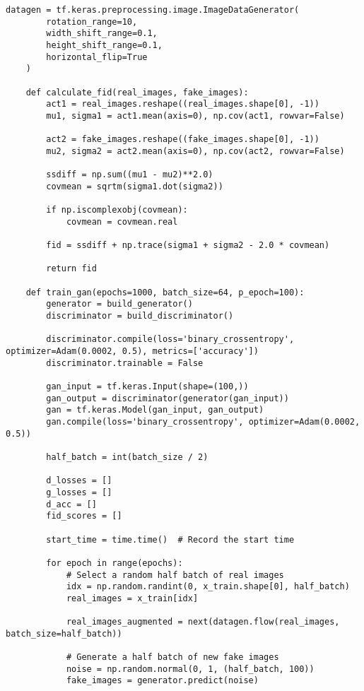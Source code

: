 \begin{lstlisting}[style=mypython, caption= Explore data augmentaion 1]
    datagen = tf.keras.preprocessing.image.ImageDataGenerator(
        rotation_range=10,
        width_shift_range=0.1,
        height_shift_range=0.1,
        horizontal_flip=True
    )
    
    def calculate_fid(real_images, fake_images):
        act1 = real_images.reshape((real_images.shape[0], -1))
        mu1, sigma1 = act1.mean(axis=0), np.cov(act1, rowvar=False)
        
        act2 = fake_images.reshape((fake_images.shape[0], -1))
        mu2, sigma2 = act2.mean(axis=0), np.cov(act2, rowvar=False)
        
        ssdiff = np.sum((mu1 - mu2)**2.0)
        covmean = sqrtm(sigma1.dot(sigma2))
        
        if np.iscomplexobj(covmean):
            covmean = covmean.real
        
        fid = ssdiff + np.trace(sigma1 + sigma2 - 2.0 * covmean)
        
        return fid
    
    def train_gan(epochs=1000, batch_size=64, p_epoch=100):
        generator = build_generator()
        discriminator = build_discriminator()
    
        discriminator.compile(loss='binary_crossentropy', optimizer=Adam(0.0002, 0.5), metrics=['accuracy'])
        discriminator.trainable = False
    
        gan_input = tf.keras.Input(shape=(100,))
        gan_output = discriminator(generator(gan_input))
        gan = tf.keras.Model(gan_input, gan_output)
        gan.compile(loss='binary_crossentropy', optimizer=Adam(0.0002, 0.5))
    
        half_batch = int(batch_size / 2)
        
        d_losses = []
        g_losses = []
        d_acc = []
        fid_scores = []
        
        start_time = time.time()  # Record the start time
    
        for epoch in range(epochs):
            # Select a random half batch of real images
            idx = np.random.randint(0, x_train.shape[0], half_batch)
            real_images = x_train[idx]
    
            real_images_augmented = next(datagen.flow(real_images, batch_size=half_batch))
    
            # Generate a half batch of new fake images
            noise = np.random.normal(0, 1, (half_batch, 100))
            fake_images = generator.predict(noise)
    

\end{lstlisting}
